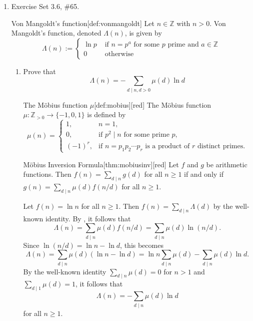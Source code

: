 \begin{enumerate}
  \item Exercise Set 3.6, \#65.
  \begin{define}{Von Mangoldt's function}[def:vonmangoldt]
  Let $n \in \mathbb{Z}$ with $n>0$. Von Mangoldt's function, denoted $\Lambda(n)$, is given by
  \[
  \Lambda(n):= \begin{cases}\ln p & \text { if } n=p^a \text { for some } p \text { prime and } a \in \mathbb{Z} \\ 0 & \text { otherwise }\end{cases}
  \]
  \end{define}
  \begin{enumerate}
    \item Prove that
    \[
    \Lambda(n)=-\sum_{d \mid n, d>0} \mu(d) \ln d
    \]
    \begin{define}{The Möbius function $\mu$}[def:mobius][red]
    The Möbius function $\mu:\mathbb{Z}_{>0}\to\{-1,0,1\}$ is defined by
    \[
    \mu(n)=
    \begin{cases}
    1,& n=1,\\[4pt]
    0,&\text{if } p^2\mid n \text{ for some prime } p,\\[4pt]
    (-1)^r,&\text{if } n=p_1p_2\cdots p_r \text{ is a product of } r \text{ distinct primes.}
    \end{cases}
    \]
    \end{define}
    \begin{define}{Möbius Inversion Formula}[thm:mobiusinv][red]
    Let $f$ and $g$ be arithmetic functions. Then $f(n)=\sum_{d\mid n} g(d)$ for all $n\ge 1$ if and only if
    $g(n)=\sum_{d\mid n}\mu(d)f(n/d)$ for all $n\ge 1$.
    \end{define}
    \begin{subprove}
      Let $f(n) = \ln n$ for all $n \geq 1$. Then $f(n) = \sum_{d \mid n} \Lambda(d)$ by the well-known identity.
      By , it follows that
      \[
      \Lambda(n) = \sum_{d \mid n} \mu(d) f(n/d) = \sum_{d \mid n} \mu(d) \ln(n/d).
      \]
      Since $\ln(n/d) = \ln n - \ln d$, this becomes
      \[
      \Lambda(n) = \sum_{d \mid n} \mu(d) (\ln n - \ln d) = \ln n \sum_{d \mid n} \mu(d) - \sum_{d \mid n} \mu(d) \ln d.
      \]
      By the well-known identity $\sum_{d \mid n} \mu(d) = 0$ for $n > 1$ and $\sum_{d \mid 1} \mu(d) = 1$, it follows that
      \[
      \Lambda(n) = -\sum_{d \mid n} \mu(d) \ln d
      \]
      for all $n \geq 1$.
    \end{subprove}
  \end{enumerate}



\end{enumerate}
